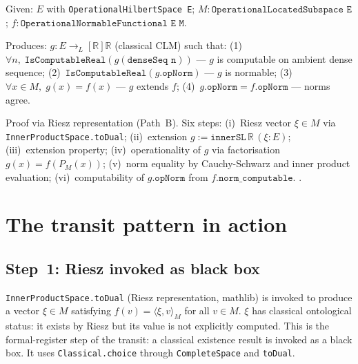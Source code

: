 \begin{theorem}
\label{thm:HahnBanachOperational_Hilbert}
\leanok
{}
Given: $E$ with \texttt{OperationalHilbertSpace E};
$M : \texttt{OperationalLocatedSubspace E}$;
$f : \texttt{OperationalNormableFunctional E M}$.

Produces: $g : E \to_L[\mathbb{R}] \mathbb{R}$ (classical CLM) such that:
(1)~$\forall n,\; \texttt{IsComputableReal}(g(\texttt{denseSeq n}))$
--- $g$ is computable on ambient dense sequence;
(2)~$\texttt{IsComputableReal}(g.\texttt{opNorm})$ --- $g$ is normable;
(3)~$\forall x \in M,\; g(x) = f(x)$ --- $g$ extends $f$;
(4)~$g.\texttt{opNorm} = f.\texttt{opNorm}$ --- norms agree.

Proof via Riesz representation (Path~B).  Six steps: (i)~Riesz vector
$\xi \in M$ via \texttt{InnerProductSpace.toDual}; (ii)~extension
$g := \texttt{innerSL}\,\mathbb{R}\,(\xi : E)$; (iii)~extension property;
(iv)~operationality of $g$ via factorisation $g(x) = f(P_M(x))$;
(v)~norm equality by Cauchy-Schwarz and inner product evaluation;
(vi)~computability of $g.\texttt{opNorm}$ from $f.\texttt{norm\_computable}$.
\noindent{}.
\end{theorem}

\section{The transit pattern in action}
\label{sec:audit_transit}

\subsection*{Step~1: Riesz invoked as black box}

\begin{remark}
\label{rem:riesz_black_box}
\leanok
{}
\texttt{InnerProductSpace.toDual} (Riesz representation, mathlib) is
invoked to produce a vector $\xi \in M$ satisfying $f(v) = \langle\xi,
v\rangle_M$ for all $v \in M$.  $\xi$ has classical ontological status:
it exists by Riesz but its value is not explicitly computed.  This is the
formal-register step of the transit: a classical existence result is invoked
as a black box.  It uses \texttt{Classical.choice} through
\texttt{CompleteSpace} and \texttt{toDual}.
\end{remark}

